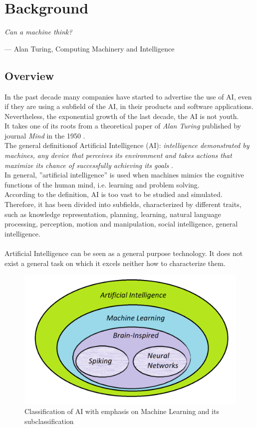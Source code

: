 \chapter{Background}

\epigraph{ \textit{Can a machine think?}}{--- \textup{Alan Turing}, Computing Machinery and Intelligence}

\section{Overview}
In the past decade many companies have started to advertise the use of AI, even if they are using a subfield of the AI, in their products and software applications. Nevertheless, the exponential growth of the last decade,
the AI is not youth.\\ It takes one of its roots from a theoretical paper of \textit{Alan Turing} published by journal \textit{Mind} in the 1950 \cite{paper:36}.\\

The general definitionof Artificial Intelligence (AI): \textit{intelligence demonstrated by machines, any device that perceives its environment and takes actions that maximize its chance of successfully achieving its goals}\cite{book:1} .\\ In general, ''artificial intelligence'' is used when machines mimics the cognitive functions of the human mind, i.e. learning and problem solving.\\
According to the definition, AI is too vast to be studied and simulated\cite{book:1}. Therefore, it has been divided into subfields, characterized by different traits, such as knowledge representation, planning, learning, natural language processing, perception, motion and manipulation, social intelligence, general intelligence.\\\\

Artificial Intelligence can be seen as a general purpose technology. It does not exist a general task on which it excels neither how to characterize them.

\begin{figure}[H]
\centering
\captionsetup{justification=centering}
\includegraphics[scale=0.5]{./figure/ai_division.png}
\caption{Classification of AI with emphasis on Machine Learning and its subclassification}
\label{fig:aidiv}
\end{figure}

